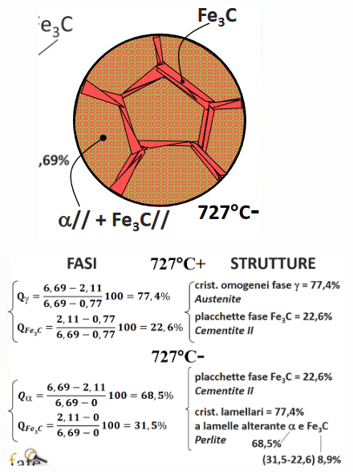 \documentclass{article}
\begin{document}
{\begin{figure}
\begin{subfigure}[h!]{.6\linewidth}
                \end{subfigure}
                \begin{subfigure}[h!]{.3\linewidth}
                    \includegraphics[width=\linewidth]{L13 - Cambio di struttura dopo l'eutettoidico.png}
                \end{subfigure}
            \end{figure}
            \begin{figure}[h!]
                \centering
                \includegraphics[width=.85\linewidth]{L13 - Fe-C 2,11C Calcolo fase e costituenti prima e dopo l'eutettoidico.png}
            \end{figure}
}
\end{document}
